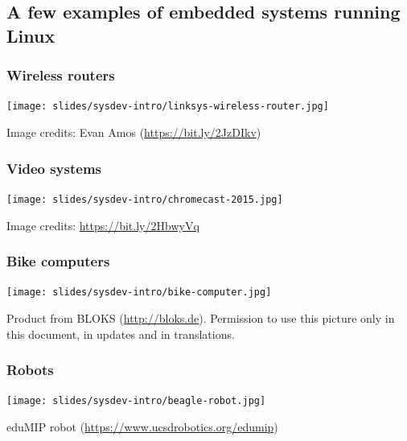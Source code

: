 \subsection[Systems running Linux]{A few examples of embedded systems
  running Linux}

\begin{frame}
  \frametitle{Wireless routers}
  \begin{center}
    \texttt{[image: slides/sysdev-intro/linksys-wireless-router.jpg]}
  \end{center}
  \tiny
  Image credits: Evan Amos (\url{https://bit.ly/2JzDIkv})
\end{frame}

\begin{frame}
\frametitle{Video systems}
  \begin{center}
    \texttt{[image: slides/sysdev-intro/chromecast-2015.jpg]}
  \end{center}
  \tiny Image credits: \url{https://bit.ly/2HbwyVq}
\end{frame}

\begin{frame}
\frametitle{Bike computers}
  \begin{center}
    \texttt{[image: slides/sysdev-intro/bike-computer.jpg]}
  \end{center}
  \tiny
  Product from BLOKS (\url{http://bloks.de}).
  Permission to use this picture only in this document, in updates and
  in translations.
\end{frame}

\begin{frame}
\frametitle{Robots}
  \begin{center}
    \texttt{[image: slides/sysdev-intro/beagle-robot.jpg]}
  \end{center}
  eduMIP robot (\url{https://www.ucsdrobotics.org/edumip})
\end{frame}

